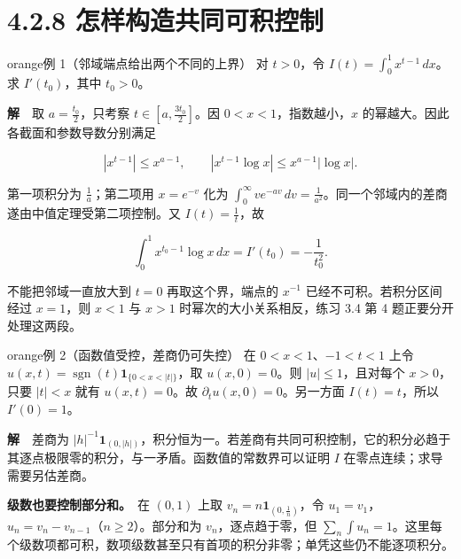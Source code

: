 \documentclass[11pt,a4paper]{article}
\begin{document}
\clearpage\section[\S{}4.2.8
怎样构造共同可积控制]{4.2.8
怎样构造共同可积控制}\label{ux600eux6837ux6784ux9020ux5171ux540cux53efux79efux63a7ux5236}

\begin{sboxenv}{orange}{例 1（邻域端点给出两个不同的上界）}
对 \(t>0\)，令 \(I(t)=\int_0^1x^{t-1}\,dx\)。求 \(I'(t_0)\)，其中
\(t_0>0\)。

\end{sboxenv}

\textbf{解}　取 \(a=\frac{t_0}{2}\)，只考察
\(t\in[a,\frac{3t_0}{2}]\)。因 \(0<x<1\)，指数越小，\(x\)
的幂越大。因此各截面和参数导数分别满足

\begin{equation*}
|x^{t-1}|\le x^{a-1},\qquad
|x^{t-1}\log x|\le x^{a-1}|\log x| .
\end{equation*}

第一项积分为 \(\frac{1}{a}\)；第二项用 \(x=e^{-v}\) 化为
\(\int_0^\infty ve^{-av}\,dv=\frac{1}{a^2}\)。同一个邻域内的差商遂由中值定理受第二项控制。又
\(I(t)=\frac{1}{t}\)，故

\begin{equation*}
\int_0^1 x^{t_0-1}\log x\,dx=I'(t_0)=-\frac{1}{t_0^2}.
\end{equation*}

不能把邻域一直放大到 \(t=0\) 再取这个界，端点的 \(x^{-1}\)
已经不可积。若积分区间经过 \(x=1\)，则 \(x<1\) 与 \(x>1\)
时幂次的大小关系相反，练习 3.4 第 4 题正要分开处理这两段。

\begin{sboxenv}{orange}{例 2（函数值受控，差商仍可失控）}
在 \(0<x<1\)、\(-1<t<1\) 上令
\(u(x,t)=\operatorname{sgn}(t)\mathbf1_{\{0<x<|t|\}}\)，取
\(u(x,0)=0\)。则 \(|u|\le1\)，且对每个 \(x>0\)，只要 \(|t|<x\) 就有
\(u(x,t)=0\)。故 \(\partial_tu(x,0)=0\)。另一方面 \(I(t)=t\)，所以
\(I'(0)=1\)。

\end{sboxenv}

\textbf{解}　差商为
\(|h|^{-1}\mathbf1_{(0,|h|)}\)，积分恒为一。若差商有共同可积控制，它的积分必趋于其逐点极限零的积分，与一矛盾。函数值的常数界可以证明
\(I\) 在零点连续；求导需要另估差商。

\textbf{级数也要控制部分和。}　在 \((0,1)\) 上取
\(v_n=n\mathbf1_{(0,\frac{1}{n})}\)，令
\(u_1=v_1\)，\(u_n=v_n-v_{n-1}\)（\(n\ge2\)）。部分和为
\(v_n\)，逐点趋于零，但
\(\sum_n\int u_n=1\)。这里每个级数项都可积，数项级数甚至只有首项的积分非零；单凭这些仍不能逐项积分。
\end{document}
